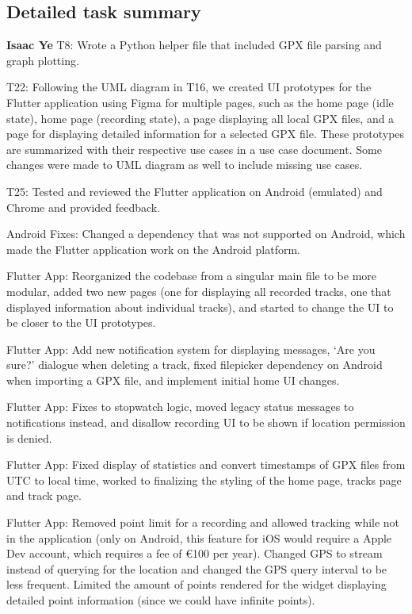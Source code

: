 \documentclass[12pt]{article}
\begin{document}
\subsection*{Detailed task summary}
{\large\textbf{Isaac Ye}}
T8: Wrote a Python helper file that included GPX file parsing and graph plotting.

T22: Following the UML diagram in T16, we created UI prototypes for the Flutter application using Figma for multiple pages, such as the home page (idle state), home page (recording state), a page displaying all local GPX files, and a page for displaying detailed information for a selected GPX file. These prototypes are summarized with their respective use cases in a use case document. Some changes were made to UML diagram as well to include missing use cases.

T25: Tested and reviewed the Flutter application on Android (emulated) and Chrome and provided feedback.

Android Fixes: Changed a dependency that was not supported on Android, which made the Flutter application work on the Android platform.

Flutter App: Reorganized the codebase from a singular main file to be more modular, added two new pages (one for displaying all recorded tracks, one that displayed information about individual tracks), and started to change the UI to be closer to the UI prototypes.

Flutter App: Add new notification system for displaying messages, ‘Are you sure?’ dialogue when deleting a track, fixed filepicker dependency on Android when importing a GPX file, and implement initial home UI changes.

Flutter App: Fixes to stopwatch logic, moved legacy status messages to notifications instead, and disallow recording UI to be shown if location permission is denied.

Flutter App: Fixed display of statistics and convert timestamps of GPX files from UTC to local time, worked to finalizing the styling of the home page, tracks page and track page.

Flutter App: Removed point limit for a recording and allowed tracking while not in the application (only on Android, this feature for iOS would require a Apple Dev account, which requires a fee of €100 per year). Changed GPS to stream instead of querying for the location and changed the GPS query interval to be less frequent. Limited the amount of points rendered for the widget displaying detailed point information (since we could have infinite points).
\end{document}

